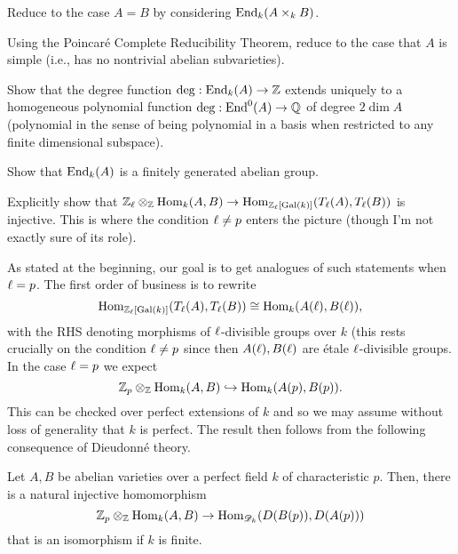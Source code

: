 \documentclass[11pt]{article}
\newcommand{\D}{\ms{D}}
\begin{document}
\begin{enum}{\arabic}
\item Reduce to the case $A=B$ by considering $\operatorname{End}_k(A\times_kB)$.


\item Using the Poincar\'{e} Complete Reducibility Theorem, reduce to the case that $A$ is simple (i.e., has no nontrivial abelian subvarieties). 

\item Show that the degree function $\deg: \operatorname{End}_k(A)\to\mathbb{Z}$ extends uniquely to a homogeneous polynomial function $\deg: \operatorname{End}^0(A)\to\mathbb{Q}$ of degree $2\dim A$ (polynomial in the sense of being polynomial in a basis when restricted to any finite dimensional subspace).

\item Show that $\operatorname{End}_k(A)$ is a finitely generated abelian group.

\item Explicitly show that $\mathbb{Z}_{\ell}\otimes_{\mathbb{Z}}\operatorname{Hom}_k(A,B)\to\operatorname{Hom}_{\mathbb{Z}_{\ell}[\operatorname{Gal}(k)]}(T_{\ell}(A),T_{\ell}(B))$ is injective. This is where the condition $\ell\neq p$ enters the picture (though I'm not exactly sure of its role).
\end{enum}

As stated at the beginning, our goal is to get analogues of such statements when $\ell=p$. The first order of business is to rewrite 
$$\operatorname{Hom}_{\mathbb{Z}_{\ell}[\operatorname{Gal}(k)]}(T_{\ell}(A),T_{\ell}(B))\cong\operatorname{Hom}_k(A(\ell),B(\ell)),$$
with the RHS denoting morphisms of $\ell$-divisible groups over $k$ (this rests crucially on the condition $\ell\neq p$ since then $A(\ell),B(\ell)$ are \'{e}tale $\ell$-divisible groups. In the case $\ell=p$ we expect 
$$\mathbb{Z}_p\otimes_{\mathbb{Z}}\operatorname{Hom}_k(A,B)\hookrightarrow\operatorname{Hom}_k(A(p),B(p)).$$
This can be checked over perfect extensions of $k$ and so we may assume without loss of generality that $k$ is perfect. The result then follows from the following consequence of Dieudonn\'{e} theory.

\begin{theorem}
Let $A,B$ be abelian varieties over a perfect field $k$ of characteristic $p$. Then, there is a natural injective homomorphism 
$$\Z_p\tensor_{\Z}\Hom_k(A,B)\to\Hom_{\D_k}(D(B(p)),D(A(p)))$$
that is an isomorphism if $k$ is finite.
\end{theorem}
\end{document}
